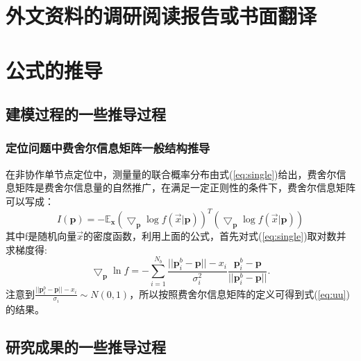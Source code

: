 \chapter{外文资料的调研阅读报告或书面翻译}

\chapter{公式的推导}
\section{建模过程的一些推导过程}
\subsection{定位问题中费舍尔信息矩阵一般结构推导}\label{A_F_1}
在非协作单节点定位中，测量量的联合概率分布由式(\ref{eq:single})给出，费舍尔信息矩阵是费舍尔信息量的自然推广，在满足一定正则性的条件下，费舍尔信息矩阵可以写成：
\begin{equation}
I(\bm{p})=-\mathbb{E}_{\bm{x}}(\bigtriangledown_{\bm{p}} \log f(\vec{x}|\bm{p}))^T(\bigtriangledown_{\bm{p}} \log f(\vec{x}|\bm{p}))
\end{equation}
其中f是随机向量$\vec{x}$的密度函数，利用上面的公式，首先对式(\ref{eq:single})取对数并求梯度得:
\begin{equation}
\bigtriangledown_{\bm{p}}\ln f=-\sum_{i=1}^{N_b}\frac{||\bm{p}_i^b-\bm{p}||-x_i}{\sigma_i^2}\frac{\bm{p}^b_i-\bm{p}}{||\bm{p}^b_i-\bm{p}||}.
\end{equation}
注意到$\frac{||\bm{p}_i^b-\bm{p}||-x_i}{\sigma_i}\sim N(0,1)$，所以按照费舍尔信息矩阵的定义可得到式(\ref{eq:uu})的结果。
\section{研究成果的一些推导过程}
